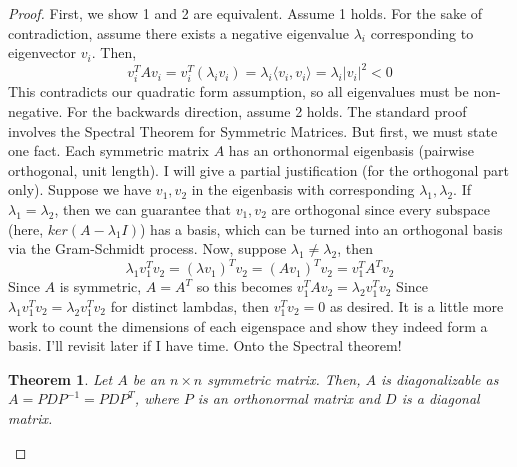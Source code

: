 \documentclass{article}
\newtheorem{theorem}{Theorem}[section]
\begin{document}
\begin{proof}
    First, we show 1 and 2 are equivalent. Assume 1 holds. For the sake of contradiction, assume there exists a negative eigenvalue $\lambda_i$ corresponding to eigenvector $v_i$. Then, $$v_i^TAv_i = v_i^T(\lambda_iv_i) = \lambda_i \langle v_i, v_i\rangle = \lambda_i|v_i|^2 < 0$$
    This contradicts our quadratic form assumption, so all eigenvalues must be non-negative. \bigskip
    \newline
    For the backwards direction, assume 2 holds. The standard proof involves the Spectral Theorem for Symmetric Matrices. But first, we must state one fact. Each symmetric matrix $A$ has an orthonormal eigenbasis (pairwise orthogonal, unit length). 
    \newline
    \noindent I will give a partial justification (for the orthogonal part only). Suppose we have $v_1, v_2$ in the eigenbasis with corresponding $\lambda_1, \lambda_2$. If $\lambda_1 = \lambda_2$, then we can guarantee that $v_1, v_2$ are orthogonal since every subspace (here, $ker(A-\lambda_1 I)$) has a basis, which can be turned into an orthogonal basis via the Gram-Schmidt process. 
    Now, suppose $\lambda_1 \neq \lambda_2$, then 
    $$ \lambda_1v_1^Tv_2 = (\lambda v_1)^Tv_2 = (Av_1)^Tv_2 = v_1^TA^Tv_2$$
    Since $A$ is symmetric, $A = A^T$ so this becomes $v_1^TAv_2 = \lambda_2v_1^Tv_2$
    Since $\lambda_1v_1^Tv_2 = \lambda_2v_1^Tv_2$ for distinct lambdas, then $v_1^Tv_2 = 0$ as desired. It is a little more work to count the dimensions of each eigenspace and show they indeed form a basis. I'll revisit later if I have time. 
    Onto the Spectral theorem! 
    
    \begin{theorem}
        Let $A$ be an $n \times n$ symmetric matrix. Then, $A$ is diagonalizable as 
        $A = PDP^{-1} = PDP^T$, where $P$ is an orthonormal matrix and $D$ is a diagonal matrix.  
    \end{theorem}
    

    
    
\end{proof}
    
\end{document}
